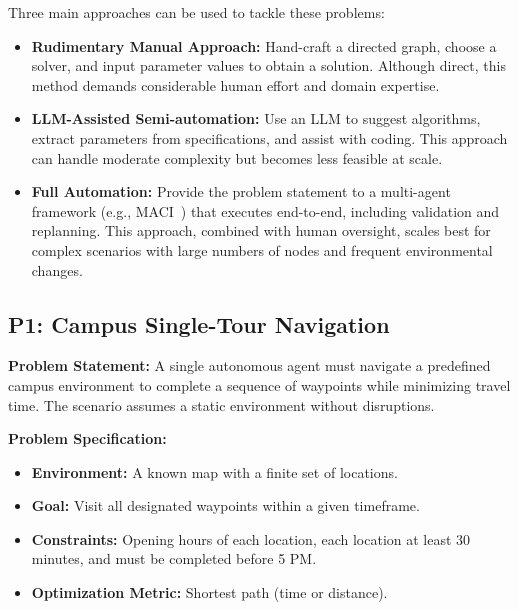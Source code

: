 Three main approaches can be used to tackle these problems:
\begin{itemize}[leftmargin=1.0em, topsep=-.0em, parsep=-.0em]
\item \textbf{Rudimentary Manual Approach:}  
Hand-craft a directed graph, choose a solver, and input parameter values to obtain a solution. Although direct, this method demands considerable human effort and domain expertise.

\item \textbf{LLM-Assisted Semi-automation:}  
Use an LLM to suggest algorithms, extract parameters from specifications, and assist with coding. This approach can handle moderate complexity but becomes less feasible at scale.

\item \textbf{Full Automation:}  
Provide the problem statement to a multi-agent framework (e.g., MACI~\cite{chang2025MACI}) that executes end-to-end, including validation and replanning. This approach, combined with human oversight, scales best for complex scenarios with large numbers of nodes and frequent environmental changes.
\end{itemize}



\subsection{P1: Campus Single-Tour Navigation}

\textbf{Problem Statement:} A single autonomous agent must navigate a predefined campus environment to complete a sequence of waypoints while minimizing travel time. The scenario assumes a static environment without disruptions.

\textbf{Problem Specification:}
\begin{itemize}[leftmargin=1.0em, topsep=-.0em, parsep=-.0em, label=-]
    \item \textbf{Environment:} A known map with a finite set of locations.
    \item \textbf{Goal:} Visit all designated waypoints within a given timeframe.
    \item \textbf{Constraints:} Opening hours of each location, each location at least 30 minutes, and must be completed before 5 PM.
    \item \textbf{Optimization Metric:} Shortest path (time or distance).
\end{itemize}

